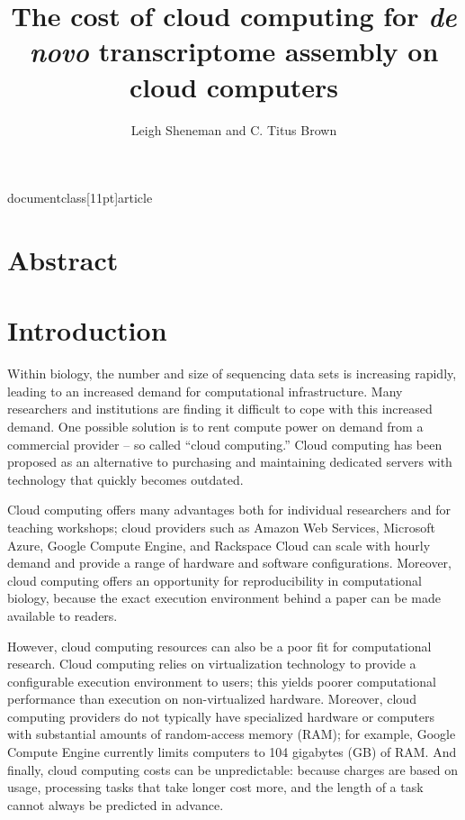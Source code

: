 documentclass[11pt]{article}



\title{The cost of cloud computing for {\em de novo} transcriptome assembly on cloud computers}
\author{Leigh Sheneman and C. Titus Brown}
\maketitle

\section*{Abstract}

\section*{Introduction}

Within biology, the number and size of sequencing data sets is increasing
rapidly, leading to an increased demand for computational infrastructure.
Many researchers and institutions are finding it difficult to cope with
this increased demand.  One possible solution is to rent compute power
on demand from a commercial provider -- so called ``cloud computing.''
Cloud computing has been proposed as an alternative to purchasing and 
maintaining dedicated servers with technology that quickly becomes outdated. 


Cloud computing offers many advantages both for individual researchers
and for teaching workshops; cloud providers such as Amazon Web
Services, Microsoft Azure, Google Compute Engine, and Rackspace Cloud
can scale with hourly demand and provide a range of hardware and
software configurations.  Moreover, cloud computing offers an
opportunity for reproducibility in computational biology, because
the exact execution environment behind a paper can be made available
to readers.

However, cloud computing resources can also be a poor fit for
computational research.  Cloud computing relies on virtualization
technology to provide a configurable execution environment to users;
this yields poorer computational performance than execution on
non-virtualized hardware.  Moreover, cloud computing providers do
not typically have specialized hardware or computers with substantial
amounts of random-access memory (RAM); for example, Google Compute
Engine currently limits computers to 104 gigabytes (GB) of RAM.
And finally, cloud computing costs can be unpredictable: because
charges are based on usage, processing tasks that take longer cost more,
and the length of a task cannot always be predicted in advance.

